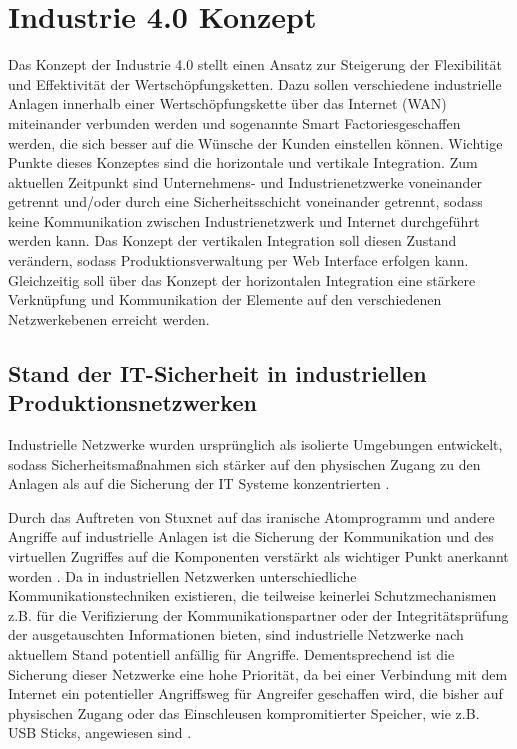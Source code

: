\section{Industrie 4.0 Konzept}
Das Konzept der Industrie 4.0 stellt einen Ansatz zur Steigerung der Flexibilität und Effektivität der Wertschöpfungsketten. Dazu sollen verschiedene industrielle Anlagen innerhalb einer Wertschöpfungskette über das Internet (WAN) miteinander verbunden werden und sogenannte \glqq Smart Factories\grqq geschaffen werden, die sich besser auf die Wünsche der Kunden einstellen können. Wichtige Punkte dieses Konzeptes sind die horizontale und vertikale Integration. Zum aktuellen Zeitpunkt sind Unternehmens- und Industrienetzwerke voneinander getrennt und/oder durch eine Sicherheitsschicht voneinander getrennt, sodass keine Kommunikation zwischen Industrienetzwerk und Internet durchgeführt werden kann. Das Konzept der vertikalen Integration soll diesen Zustand verändern, sodass Produktionsverwaltung per Web Interface erfolgen kann. Gleichzeitig soll über das Konzept der horizontalen Integration eine stärkere Verknüpfung und Kommunikation der Elemente auf den verschiedenen Netzwerkebenen erreicht werden\citep{Ind401}.


\subsection{Stand der IT-Sicherheit in industriellen Produktionsnetzwerken}
Industrielle Netzwerke wurden ursprünglich als isolierte Umgebungen entwickelt, sodass Sicherheitsmaßnahmen sich stärker auf den physischen Zugang zu den Anlagen als auf die Sicherung der IT Systeme konzentrierten \citep{6622964}. 

Durch das Auftreten von Stuxnet auf das iranische Atomprogramm und andere Angriffe auf industrielle Anlagen ist die Sicherung der Kommunikation und des virtuellen Zugriffes auf die Komponenten verstärkt als wichtiger Punkt anerkannt worden \citep{6622964}. 
Da in industriellen Netzwerken unterschiedliche Kommunikationstechniken existieren, die teilweise keinerlei Schutzmechanismen z.B. für die Verifizierung der Kommunikationspartner oder der Integritätsprüfung der ausgetauschten Informationen bieten, sind industrielle Netzwerke nach aktuellem Stand potentiell anfällig für Angriffe. Dementsprechend ist die Sicherung dieser Netzwerke eine hohe Priorität, da bei einer Verbindung mit dem Internet ein potentieller Angriffsweg für Angreifer geschaffen wird, die bisher auf physischen Zugang oder das Einschleusen kompromitierter Speicher, wie z.B. USB Sticks, angewiesen sind \citep{6622964}. 

